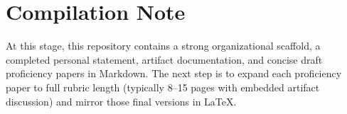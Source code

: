 \documentclass[12pt]{article}
\begin{document}
\section*{Compilation Note}
At this stage, this repository contains a strong organizational scaffold, a completed personal statement, artifact documentation, and concise draft proficiency papers in Markdown. The next step is to expand each proficiency paper to full rubric length (typically 8--15 pages with embedded artifact discussion) and mirror those final versions in \LaTeX{}.
\end{document}
